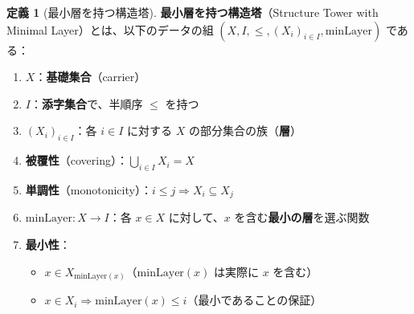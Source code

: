 \documentclass[a4paper,12pt]{ltjsarticle}
\theoremstyle{definition}
\newtheorem{definition}[theorem]{定義}
\begin{document}
\begin{definition}[最小層を持つ構造塔]\label{def:structure_tower}
\textbf{最小層を持つ構造塔}（Structure Tower with Minimal Layer）とは、以下のデータの組 $(X, I, \leq, (X_i)_{i \in I}, \mathrm{minLayer})$ である：

\begin{enumerate}
\item $X$：\textbf{基礎集合}（carrier）
\item $I$：\textbf{添字集合}で、半順序 $\leq$ を持つ
\item $(X_i)_{i \in I}$：各 $i \in I$ に対する $X$ の部分集合の族（\textbf{層}）
\item \textbf{被覆性}（covering）：$\bigcup_{i \in I} X_i = X$
\item \textbf{単調性}（monotonicity）：$i \leq j \Rightarrow X_i \subseteq X_j$
\item $\mathrm{minLayer} : X \to I$：各 $x \in X$ に対して、$x$ を含む\textbf{最小の層}を選ぶ関数
\item \textbf{最小性}：
  \begin{itemize}
  \item $x \in X_{\mathrm{minLayer}(x)}$（$\mathrm{minLayer}(x)$ は実際に $x$ を含む）
  \item $x \in X_i \Rightarrow \mathrm{minLayer}(x) \leq i$（最小であることの保証）
  \end{itemize}
\end{enumerate}
\end{definition}
\end{document}

